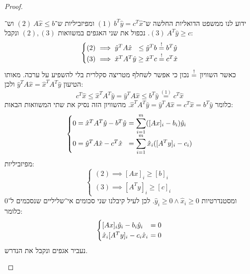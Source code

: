 \documentclass[]{../../../../tex/classes/homework}
\newcommand\qq  {(\mathrm{1})}
\newcommand\ww  {(\mathrm{2})}
\newcommand\ee  {(\mathrm{3})}
\begin{document}
\begin{proof}
\begin{itemize}
			ידוע לנו ממשפט הדואליות החלשה ש־$\qq \ b^T\hat y = c^T\hat x$ ומפיזביליות ש־$\ww \ A\hat x \le b$ וש־$\ee \ A^T\hat y \ge c$. נכפול את שני האגפים במשוואות $\ww, \ee$ ונקבל: 
			\[ \begin{cases}
				\ww &\ \dequad \implies \hat y^TA\hat x \ \ \le \hat y^Tb \seq b^T\hat y \\
				\ee &\ \dequad \implies \hat x^TA^T\hat y \ge \hat x^Tc \seq c^T\hat x
			\end{cases} \]
			כאשר השוויון $\overset{!}{=}$ נכון כי אפשר לשחלף מטריצה סקלרית בלי להשפיע על ערכה. מאותו הטיעון $\hat y^TA\hat x = \hat x^TA^T\hat y$ ולכן: 
			\[ c^T\hat x \le \hat x^TA^T\hat y = \hat y^TA\hat x \le b^T\hat y \overset{\qq}{=} c^T\hat x \]
			כלומר $ \hat x^TA^T\hat y = \hat y^TA\hat x = c^T\hat x = b^T\hat y$. מהשוויון הזה נסיק את שתי המשוואות הבאות: 
			\[ \begin{cases}
				0 = \hat x^T A^T\hat y - b^T\hat y &\disty\dequad \ = \sum_{i = 1}^{m}([Ax]_i - b_i)\hat y_i \\
				0 = \hat y^T A\hat x - c^T\hat x   &\disty\dequad \ = \sum_{i = 1}^{m}\hat x_i ([A^Ty]_i - c_i)
			\end{cases} \]
			מפיזביליות: 
			\[ \begin{cases}
				\ww \implies [Ax]_i \ge [b]_i \\
				\ee \implies [A^Ty]_i \ge [c]_i
			\end{cases} \]
			ומסטנדרטיות $\hat y_i \ge 0 \land \hat x_i \ge 0$. לכן לעיל קיבלנו שני סכומים אי־שליליים שנסכמים ל־$0$ כלומר: 
			\[ \begin{cases}
				[Ax]_i\hat y_i - b_i\hat y_i &\dequad \ = 0 \\
				\hat x_i [A^Ty]_i - c_i\hat x_i &\dequad \ = 0
			\end{cases} \]
			נעביר אגפים ונקבל את הנדרש. 
		\end{itemize}\envendproof
	\end{proof}
	
	\npage
	
\end{document}

